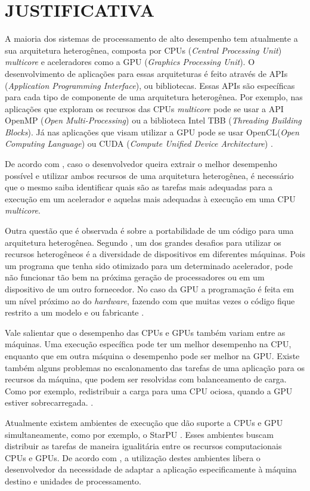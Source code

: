 
\chapter{JUSTIFICATIVA}
\label{chap:justificativa}

A maioria dos sistemas de processamento de alto desempenho tem atualmente a sua arquitetura heterogênea,
composta por CPUs (\textit{Central Processing Unit}) \textit{multicore} e aceleradores como a GPU (\textit{Graphics Processing Unit}).
O desenvolvimento de aplicações para essas arquiteturas é feito através de APIs (\textit{Application Programming Interface}), ou bibliotecas.
Essas APIs são específicas para cada tipo de componente de uma arquitetura heterogênea. Por exemplo, nas aplicações que exploram os recursos
das CPUs \textit{multicore} pode se usar a API OpenMP (\textit{Open Multi-Processing}) \cite{openmp:2018} ou a biblioteca
Intel TBB \cite{inteltbb:2018} (\textit{Threading Building Blocks}).
Já nas aplicações que visam utilizar a GPU pode se usar OpenCL(\textit{Open Computing Language}) \cite{opencl:2018} ou CUDA (\textit{Compute Unified Device Architecture}) \cite{cuda:2018}.

De acordo com \cite{intrArqHete:2012}, caso o desenvolvedor queira extrair o melhor desempenho possível e utilizar ambos recursos de uma
arquitetura heterogênea, é necessário que o mesmo saiba identificar quais são as tarefas mais adequadas para a execução em um acelerador
e aquelas mais adequadas à execução em uma CPU \textit{multicore}.

Outra questão que é observada é sobre a portabilidade de um código para uma arquitetura heterogênea.
Segundo \cite{problemsArqHete:2013}, um dos grandes desafios para utilizar os recursos heterogêneos é a diversidade de dispositivos em diferentes máquinas.
Pois um programa que tenha sido otimizado para um determinado acelerador, pode não funcionar tão bem na próxima geração de processadores ou em um dispositivo de um outro fornecedor.
No caso da GPU a programação é feita em um nível próximo ao do \textit{hardware}, fazendo com que muitas vezes o código fique restrito a um modelo e ou fabricante \cite{pinto2011ambientes}.

Vale salientar que o desempenho das CPUs e GPUs também variam entre as máquinas.
Uma execução específica pode ter um melhor desempenho na CPU, enquanto que em outra máquina o desempenho pode ser melhor na GPU.
Existe também alguns problemas no escalonamento das tarefas de uma aplicação para os recursos da máquina, que podem ser resolvidas com balanceamento de carga.
Como por exemplo, redistribuir a carga para uma CPU ociosa, quando a GPU estiver sobrecarregada. \cite{problemsArqHete:2013}.

Atualmente existem ambientes de execução que dão suporte a CPUs e GPU simultaneamente, como por exemplo, o StarPU \cite{augonnet2011scheduling}.
Esses ambientes buscam distribuir as tarefas de maneira igualitária entre os recursos computacionais CPUs e GPUs.
De acordo com \cite{kumar:tel-01538516}, a utilização destes ambientes libera o desenvolvedor da necessidade de adaptar a aplicação especificamente
à máquina destino e unidades de processamento.
